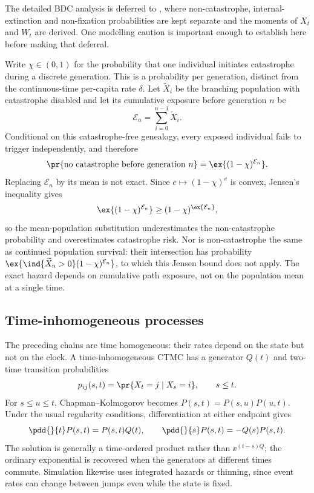 The detailed BDC analysis is deferred to
, where
non-catastrophe, internal-extinction and non-fixation probabilities are kept
separate and the moments of $X_t$ and $W_t$ are derived. One modelling caution
is important enough to establish here before making that deferral.

\begin{remark}
\label{m:rem:notmeanfield}
Write $\chi\in(0,1)$ for the probability that one individual initiates
catastrophe during a discrete generation. This is a probability per
generation, distinct from the continuous-time per-capita rate $\delta$. Let
$\widetilde X_i$ be the branching population with catastrophe disabled and
let its cumulative exposure before generation $n$ be
\[
\mathcal E_n=\sum_{i=0}^{n-1}\widetilde X_i.
\]
Conditional on this catastrophe-free genealogy, every exposed individual
fails to trigger independently, and therefore
\begin{equation}
\label{m:eq:norupture}
\pr{\text{no catastrophe before generation }n}
=\ex{(1-\chi)^{\mathcal E_n}}.
\end{equation}
Replacing $\mathcal E_n$ by its mean is not exact. Since
$e\mapsto(1-\chi)^e$ is convex, Jensen's inequality gives
\[
\ex{(1-\chi)^{\mathcal E_n}}
\ge(1-\chi)^{\ex{\mathcal E_n}},
\]
so the mean-population substitution underestimates the non-catastrophe
probability and overestimates catastrophe risk. Nor is non-catastrophe the
same as continued population survival: their intersection has probability
$\ex{\ind\{\widetilde X_n>0\}(1-\chi)^{\mathcal E_n}}$, to which this Jensen
bound does not apply. The exact hazard depends on cumulative path exposure,
not on the population mean at a single time.
\end{remark}

\FloatBarrier

\subsection{Time-inhomogeneous processes}
\label{m:sec:inhomogeneous}

The preceding chains are time homogeneous: their rates depend on the state
but not on the clock. A time-inhomogeneous CTMC has a generator $Q(t)$ and
two-time transition probabilities
\begin{equation}
\label{m:eq:inhomogtrans}
p_{ij}(s,t)=\pr{X_t=j\mid X_s=i},
\qquad s\le t.
\end{equation}
For $s\le u\le t$, Chapman--Kolmogorov becomes
$P(s,t)=P(s,u)P(u,t)$. Under the usual regularity conditions, differentiation
at either endpoint gives
\begin{equation}
\label{m:eq:inhomogkolmogorov}
\pdd{}{t}P(s,t)=P(s,t)Q(t),
\qquad
\pdd{}{s}P(s,t)=-Q(s)P(s,t).
\end{equation}
The solution is generally a time-ordered product rather than
$\ee^{(t-s)Q}$; the ordinary exponential is recovered when the generators
at different times commute. Simulation likewise uses integrated hazards or
thinning, since event rates can change between jumps even while the state is
fixed.

